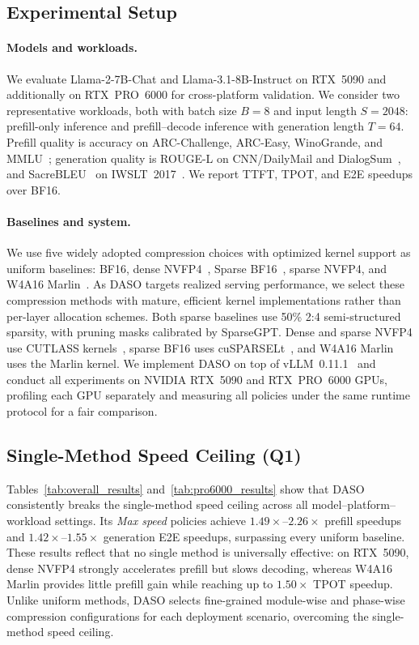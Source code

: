 \documentclass[letterpaper]{article} %
\begin{document}
\subsection{Experimental Setup}

\paragraph{Models and workloads.}
We evaluate Llama-2-7B-Chat and Llama-3.1-8B-Instruct on RTX~5090 and additionally on RTX~PRO~6000 for cross-platform validation. We consider two representative workloads, both with batch size $B=8$ and input length $S=2048$: prefill-only inference and prefill--decode inference with generation length $T=64$. Prefill quality is accuracy on ARC-Challenge, ARC-Easy, WinoGrande, and MMLU~\cite{clark2018arc,sakaguchi2020winogrande,hendrycks2021mmlu}; generation quality is ROUGE-L on CNN/DailyMail and DialogSum~\cite{nallapati2016cnndm,chen2021dialogsum,lin2004rouge}, and SacreBLEU~\cite{post2018call} on IWSLT~2017~\cite{cettolo2017iwslt}. We report TTFT, TPOT, and E2E speedups over BF16.

\paragraph{Baselines and system.}
We use five widely adopted compression choices with optimized kernel support as uniform baselines: BF16, dense NVFP4~\cite{alvarez2025nvfp4}, Sparse BF16~\cite{frantar2023sparsegpt}, sparse NVFP4, and W4A16 Marlin~\cite{frantar2025marlin}. As DASO targets realized serving performance, we select these compression methods with mature, efficient kernel implementations rather than per-layer allocation schemes. Both sparse baselines use 50\% 2:4 semi-structured sparsity, with pruning masks calibrated by SparseGPT. Dense and sparse NVFP4 use CUTLASS kernels~\cite{thakkar2023cutlass}, sparse BF16 uses cuSPARSELt~\cite{busato2020cusparselt}, and W4A16 Marlin uses the Marlin kernel. We implement DASO on top of vLLM~0.11.1~\cite{kwon2023vllm} and conduct all experiments on NVIDIA RTX~5090 and RTX~PRO~6000 GPUs, profiling each GPU separately and measuring all policies under the same runtime protocol for a fair comparison.

\subsection{Single-Method Speed Ceiling (Q1)}

Tables~\ref{tab:overall_results} and~\ref{tab:pro6000_results} show that DASO consistently breaks the single-method speed ceiling across all model--platform--workload settings. Its \emph{Max speed} policies achieve $1.49\times$--$2.26\times$ prefill speedups and $1.42\times$--$1.55\times$ generation E2E speedups, surpassing every uniform baseline. These results reflect that no single method is universally effective: on RTX~5090, dense NVFP4 strongly accelerates prefill but slows decoding, whereas W4A16 Marlin provides little prefill gain while reaching up to $1.50\times$ TPOT speedup. Unlike uniform methods, DASO selects fine-grained module-wise and phase-wise compression configurations for each deployment scenario, overcoming the single-method speed ceiling.
\end{document}
